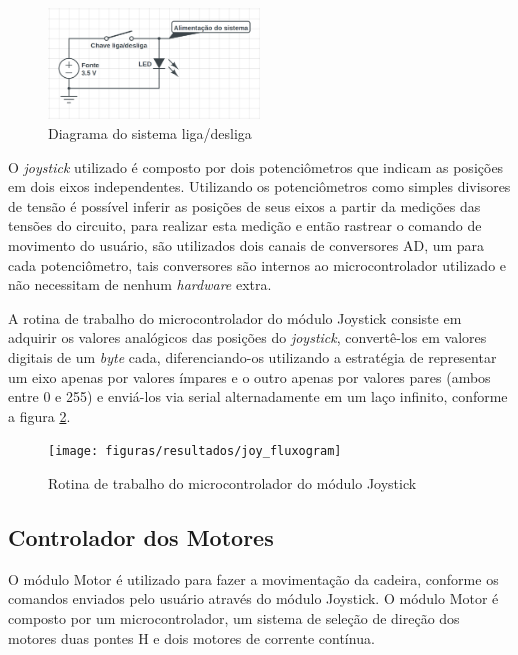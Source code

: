 		\begin{figure}[!htb]
			\centering
			\includegraphics[width = 0.5\textwidth]{figuras/resultados/onoff-system}
			\caption{Diagrama do sistema liga/desliga}
			\label{fig:onoff-system}
		\end{figure}

		O \textit{joystick} utilizado é composto por dois potenciômetros que indicam as posições em dois eixos independentes. Utilizando os potenciômetros como simples divisores de tensão é possível inferir as posições de seus eixos a partir da medições das tensões do circuito, para realizar esta medição e então rastrear o comando de movimento do usuário, são utilizados dois canais de conversores AD, um para cada potenciômetro, tais conversores são internos ao microcontrolador utilizado e não necessitam de nenhum \textit{hardware} extra.

		A rotina de trabalho do microcontrolador do módulo Joystick consiste em adquirir os valores analógicos das posições do \textit{joystick}, convertê-los em valores digitais de um \textit{byte} cada, diferenciando-os utilizando a estratégia de representar um eixo apenas por valores ímpares e o outro apenas por valores pares (ambos entre 0 e 255) e enviá-los via serial alternadamente em um laço infinito, conforme a figura \ref{fig:joy_fluxogram}.

		\begin{figure}[!htb]
			\centering
			\texttt{[image: figuras/resultados/joy\_fluxogram]}
			\caption{Rotina de trabalho do microcontrolador do módulo Joystick}
			\label{fig:joy_fluxogram}
		\end{figure}

	\subsection{Controlador dos Motores}

		O módulo Motor é utilizado para fazer a movimentação da cadeira, conforme os comandos enviados pelo usuário através do módulo Joystick. O módulo Motor é composto por um microcontrolador, um sistema de seleção de direção dos motores duas pontes H e dois motores de corrente contínua.

